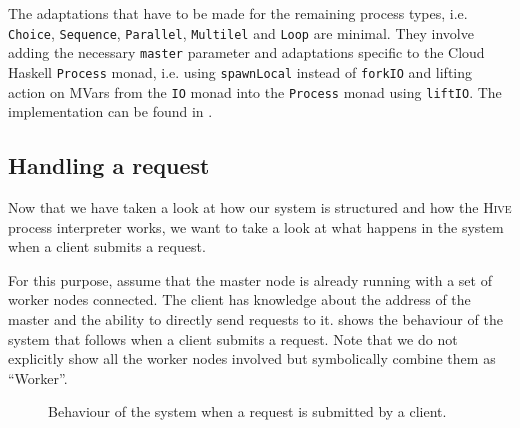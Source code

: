 The adaptations that have to be made for the remaining process types, i.e. \texttt{Choice}, \texttt{Sequence}, \texttt{Parallel}, \texttt{Multilel} and \texttt{Loop} are minimal. They involve adding the necessary \texttt{master} parameter and adaptations specific to the \textsf{Cloud Haskell} \texttt{Process} monad, i.e. using \texttt{spawnLocal} instead of \texttt{forkIO} and lifting action on MVars from the \texttt{IO} monad into the \texttt{Process} monad using \texttt{liftIO}. The implementation can be found in .


\subsection{Handling a request}
Now that we have taken a look at how our system is structured and how the \textsc{Hive} process interpreter works, we want to take a look at what happens in the system when a client submits a request.

For this purpose, assume that the master node is already running with a set of worker nodes connected. The client has knowledge about the address of the master and the ability to directly send requests to it.  shows the behaviour of the system that follows when a client submits a request. Note that we do not explicitly show all the worker nodes involved but symbolically combine them as \enquote{Worker}.

\begin{figure}[h!]
  \centering
  
  \caption{Behaviour of the system when a request is submitted by a client.}
  \label{fig:request_handling}
\end{figure}

